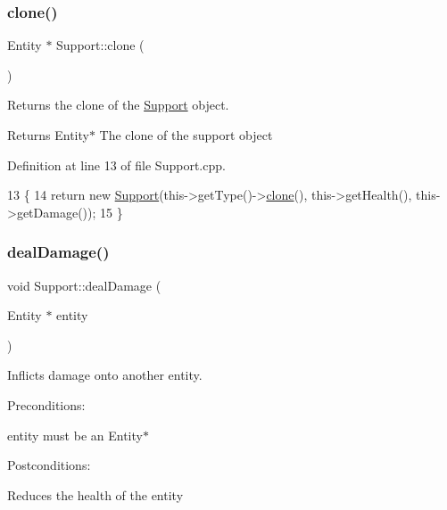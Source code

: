 \subsubsection{\texorpdfstring{clone()}{clone()}}
{\footnotesize\ttfamily Entity $\ast$ Support\+::clone (\begin{DoxyParamCaption}{ }\end{DoxyParamCaption})}



Returns the clone of the \hyperlink{classSupport}{Support} object. 

\begin{DoxyReturn}{Returns}
Entity$\ast$ The clone of the support object 
\end{DoxyReturn}


Definition at line 13 of file Support.\+cpp.


\begin{DoxyCode}
13                        \{
14     \textcolor{keywordflow}{return} \textcolor{keyword}{new} \hyperlink{classSupport_a8b4c631dcfd81be50ee86f3ed01d5c1e}{Support}(this->getType()->\hyperlink{classSupport_aa54197d3679118ba6c2dfaf7f15ac5de}{clone}(), this->getHealth(), this->getDamage());
15 \}
\end{DoxyCode}
\mbox{\label{classSupport_a5f2cb243e746adea36b3c78548029ce3}} 
\subsubsection{\texorpdfstring{deal\+Damage()}{dealDamage()}}
{\footnotesize\ttfamily void Support\+::deal\+Damage (\begin{DoxyParamCaption}\item[{Entity $\ast$}]{entity }\end{DoxyParamCaption})}



Inflicts damage onto another entity. 

Preconditions\+:
\begin{DoxyItemize}
\item entity must be an Entity$\ast$
\end{DoxyItemize}

Postconditions\+:
\begin{DoxyItemize}
\item Reduces the health of the entity
\end{DoxyItemize}


